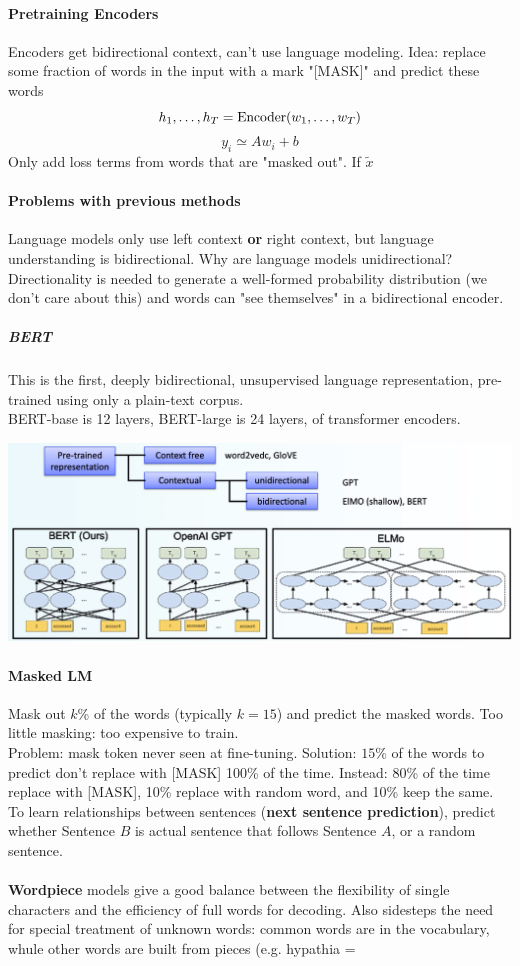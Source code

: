 \documentclass[10pt]{report}
\begin{document}
\paragraph{Pretraining Encoders} Encoders get bidirectional context, can't use language modeling. Idea: replace some fraction of words in the input with a mark "[MASK]" and predict these words
$$h_1,\ldots,h_T = \hbox{Encoder}(w_1,\ldots,w_T)$$
$$y_i\simeq Aw_i + b$$
Only add loss terms from words that are "masked out". If $\tilde{x}$ %
\paragraph{Problems with previous methods} Language models only use left context \textbf{or} right context, but language understanding is bidirectional. Why are language models unidirectional? Directionality is needed to generate a well-formed probability distribution (we don't care about this) and words can "see themselves" in a bidirectional encoder.
\subparagraph{BERT} This is the first, deeply bidirectional, unsupervised language representation, pre-trained using only a plain-text corpus.\\
BERT-base is 12 layers, BERT-large is 24 layers, of transformer encoders.
\begin{center}
	\includegraphics[scale=0.5]{76.png}
\end{center}
\paragraph{Masked LM} Mask out $k$\% of the words (typically $k=15$) and predict the masked words. Too little masking: too expensive to train.\\
Problem: mask token never seen at fine-tuning. Solution: $15\%$ of the words to predict don't replace with [MASK] 100\% of the time. Instead: 80\% of the time replace with [MASK], 10\% replace with random word, and 10\% keep the same.\\
To learn relationships between sentences (\textbf{next sentence prediction}), predict whether Sentence $B$ is actual sentence that follows Sentence $A$, or a random sentence.\\\\
\textbf{Wordpiece} models give a good balance between the flexibility of single characters and the efficiency of full words for decoding. Also sidesteps the need for special treatment of unknown words: common words are in the vocabulary, whule other words are built from pieces (e.g. hypathia = %
\end{document}
